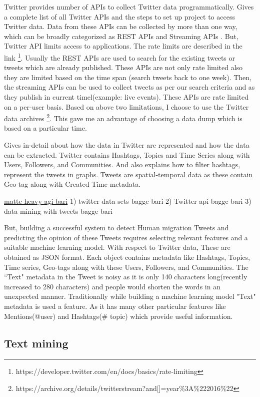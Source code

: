 Twitter provides number of APIs to collect Twitter data programmatically. \cite{TwitterDevDocs} Gives a complete list of all Twitter APIs and the steps to set up project to access Twitter data. Data from these APIs can be collected by more than one way, which can be broadly categorized as REST APIs and Streaming APIs . But, Twitter API limits access to applications. The rate limits are described in the link  \footnote{https://developer.twitter.com/en/docs/basics/rate-limiting}. Usually the REST APIs are used to search for the existing tweets or tweets which are already published. These APIs are not only rate limited also they are limited based on the time span (search tweets back to one week). Then, the streaming APIs can be used to collect tweets as per our search criteria and as they publish in current timel(example: live events). These APIs are rate limited on a per-user basis. Based on above two limitations, I choose to use the Twitter data archives \footnote{https://archive.org/details/twitterstream?and[]=year\%3A\%222016\%22}. This gave me an advantage of choosing a data dump which is based on a particular time.   


\cite{Marco} Gives in-detail about how the data in Twitter are represented
and how the data can be extracted. Twitter contains Hashtags, Topics and Time Series along with
Users, Followers, and Communities. And  \cite{Marco} also explains how to filter hashtags, represent the
tweets in graphs. Tweets are spatial-temporal data as these contain Geo-tag along with Created
Time metadata.

\underline{matte heavy agi bari}
1) twitter data sets bagge bari
2) Twitter api bagge bari
3) data mining with tweets bagge bari


 But, building a successful system to detect Human migration Tweets and predicting the opinion of these Tweets requires selecting relevant features and a suitable machine learning model. With respect to Twitter data, These are obtained as JSON format. Each object contains metadata like Hashtags, Topics, Time series, Geo-tags along with these Users, Followers, and Communities. The ``Text" metadata in the Tweet is noisy as it is only 140 characters long(recently increased to 280 characters) and people would shorten the words in an unexpected manner. Traditionally while building a machine learning model "Text" metadata is used a feature. As it has many other particular features like Mentions(@user) and Hashtags(\# topic) which provide useful information.
 
 
\subsection{Text mining}

